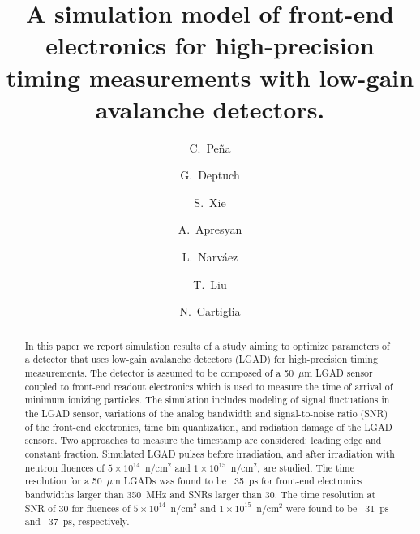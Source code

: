 \documentclass[preprint,1p]{elsarticle}
\begin{document}
\linenumbers

\begin{frontmatter}



\title{A simulation model of front-end electronics for high-precision timing measurements with low-gain avalanche detectors.}


\author[1,2]{C.~Pe\~na}
\author[1]{G.~Deptuch}
\author[2]{S.~Xie}
\author[1]{A.~Apresyan}
\author[2]{L.~Narv\'aez}
\author[1]{T.~Liu}
\author[3]{N.~Cartiglia}


\address[1]{Fermi National Accelerator Laboratory, Batavia, IL, USA}
\address[2]{California Institute of Technology, Pasadena, CA, USA}
\address[3]{INFN, Torino, Italy}

\begin{abstract}
In this paper we report simulation results of a study aiming to optimize 
parameters of a detector that uses low-gain avalanche detectors (LGAD) for
high-precision timing measurements. The detector is assumed to be composed of a
50~$\mu$m LGAD sensor coupled to front-end readout electronics which is used to
measure the time of arrival of minimum ionizing particles. The simulation
includes modeling of signal fluctuations in the LGAD sensor, variations of the analog
bandwidth and signal-to-noise ratio (SNR) of the front-end electronics, time
bin quantization, and radiation damage of the LGAD sensors. Two approaches to
measure the timestamp are considered: leading edge and constant fraction.
Simulated LGAD pulses before irradiation, and after irradiation with 
neutron fluences of $5\times 10^{14}$~n/cm$^2$ and $1\times 10^{15}$~n/cm$^2$,
are studied. The time resolution for a 50~$\mu$m LGADs was found to be ~35~\si{ps}
for front-end electronics bandwidths larger than 350~\si{MHz} and SNRs larger
than 30. The time resolution at SNR of 30 for fluences of $5\times
10^{14}$~n/cm$^2$ and $1\times 10^{15}$~n/cm$^2$ were found to be ~31~\si{ps}
and ~37~\si{ps}, respectively. 
\end{abstract}


\end{frontmatter}
\end{document}
